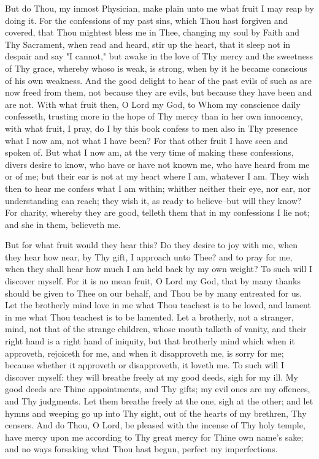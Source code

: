 \documentclass[b5paper,openright,12pt,twoside]{book}
\begin{document}
But do Thou, my inmost Physician, make plain unto me what fruit I may
reap by doing it. For the confessions of my past sins, which Thou hast
forgiven and covered, that Thou mightest bless me in Thee, changing my
soul by Faith and Thy Sacrament, when read and heard, stir up the heart,
that it sleep not in despair and say "I cannot," but awake in the love
of Thy mercy and the sweetness of Thy grace, whereby whoso is weak, is
strong, when by it he became conscious of his own weakness. And the good
delight to hear of the past evils of such as are now freed from them,
not because they are evils, but because they have been and are not. With
what fruit then, O Lord my God, to Whom my conscience daily confesseth,
trusting more in the hope of Thy mercy than in her own innocency,
with what fruit, I pray, do I by this book confess to men also in Thy
presence what I now am, not what I have been? For that other fruit I
have seen and spoken of. But what I now am, at the very time of making
these confessions, divers desire to know, who have or have not known me,
who have heard from me or of me; but their ear is not at my heart where
I am, whatever I am. They wish then to hear me confess what I am within;
whither neither their eye, nor ear, nor understanding can reach; they
wish it, as ready to believe--but will they know? For charity, whereby
they are good, telleth them that in my confessions I lie not; and she in
them, believeth me.

But for what fruit would they hear this? Do they desire to joy with me,
when they hear how near, by Thy gift, I approach unto Thee? and to pray
for me, when they shall hear how much I am held back by my own weight?
To such will I discover myself. For it is no mean fruit, O Lord my God,
that by many thanks should be given to Thee on our behalf, and Thou be
by many entreated for us. Let the brotherly mind love in me what Thou
teachest is to be loved, and lament in me what Thou teachest is to be
lamented. Let a brotherly, not a stranger, mind, not that of the strange
children, whose mouth talketh of vanity, and their right hand is a
right hand of iniquity, but that brotherly mind which when it approveth,
rejoiceth for me, and when it disapproveth me, is sorry for me; because
whether it approveth or disapproveth, it loveth me. To such will I
discover myself: they will breathe freely at my good deeds, sigh for my
ill. My good deeds are Thine appointments, and Thy gifts; my evil ones
are my offences, and Thy judgments. Let them breathe freely at the one,
sigh at the other; and let hymns and weeping go up into Thy sight,
out of the hearts of my brethren, Thy censers. And do Thou, O Lord,
be pleased with the incense of Thy holy temple, have mercy upon me
according to Thy great mercy for Thine own name's sake; and no ways
forsaking what Thou hast begun, perfect my imperfections.
\end{document}
